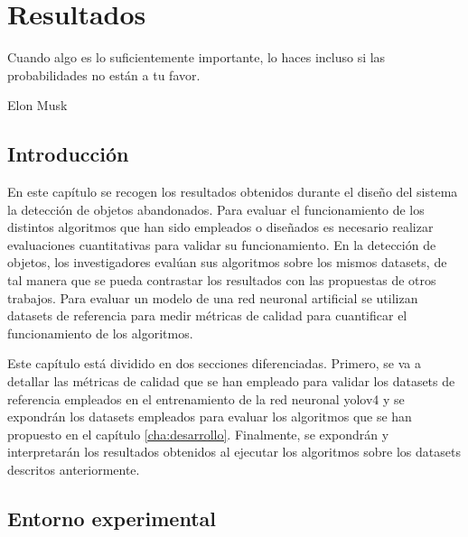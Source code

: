 
\chapter{Resultados}
\label{cha:resultados}

\begin{FraseCelebre}
  \begin{Frase}
    Cuando algo es lo suficientemente importante, lo haces incluso si las probabilidades no están a tu favor.
  \end{Frase}
  \begin{Fuente}
    Elon Musk
  \end{Fuente}
\end{FraseCelebre}

\section{Introducción}
\label{sec:intro-resultados}

En este capítulo se recogen los resultados obtenidos durante el diseño del sistema la detección de objetos abandonados. Para evaluar el funcionamiento de los distintos algoritmos que han sido empleados o diseñados es necesario realizar evaluaciones cuantitativas para validar su funcionamiento. En la detección de objetos, los investigadores evalúan sus algoritmos sobre los mismos datasets, de tal manera que se pueda contrastar los resultados con las propuestas de otros trabajos. Para evaluar un modelo de una red neuronal artificial se utilizan datasets de referencia para medir métricas de calidad para cuantificar el funcionamiento de los algoritmos.

Este capítulo está dividido en dos secciones diferenciadas. Primero, se va a detallar las métricas de calidad que se han empleado para validar los datasets de referencia empleados en el entrenamiento de la red neuronal \gls{yolov4} y se expondrán los datasets empleados para evaluar los algoritmos que se han propuesto en el capítulo \ref{cha:desarrollo}. Finalmente, se expondrán y interpretarán los resultados obtenidos al ejecutar los algoritmos sobre los datasets descritos anteriormente.

\section{Entorno experimental}
\label{sec:desarrollo-resultados}

